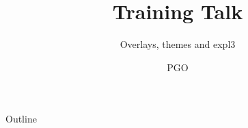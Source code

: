 \documentclass{beamer}
\title{Training Talk}
\subtitle{Overlays, themes and expl3}
\author{PGO}
\institute{TeXyoN}
\date{}
\begin{document}
\frame{\titlepage}
\begin{frame}{Outline}\tableofcontents\end{frame}
\end{document}
